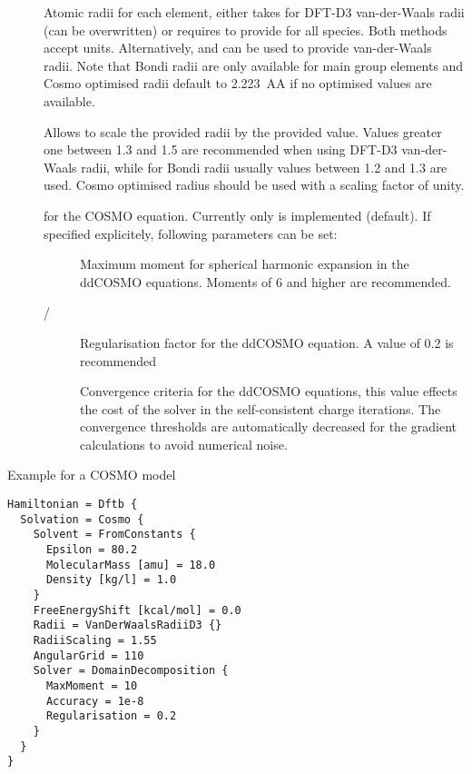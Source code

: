 \begin{description}
  \item[] Atomic radii for each element, either takes
     for DFT-D3 van-der-Waals radii (can be overwritten)
    or requires to provide  for all species.
    Both methods accept  units.
    Alternatively,  and 
    can be used to provide van-der-Waals radii. Note that Bondi radii\cite{mantina2009}
    are only available for main group elements and Cosmo optimised radii default to
    2.223~AA if no optimised values are available.

  \item[] Allows to scale the provided radii by the provided value.
    Values greater one between 1.3 and 1.5 are recommended when using DFT-D3 van-der-Waals
    radii, while for Bondi radii usually values between 1.2 and 1.3 are used.
    Cosmo optimised radius should be used with a scaling factor of unity.

  \item[] for the COSMO equation. Currently only
     is implemented (default). If specified
    explicitely, following parameters can be set:

    \begin{description}
      \item[]
        Maximum moment for spherical harmonic expansion in the ddCOSMO equations.
        Moments of 6 and higher are recommended.
      \item[ / ]
        Regularisation factor for the ddCOSMO equation. A value of 0.2 is recommended
      \item[]
        Convergence criteria for the ddCOSMO equations, this value effects the cost
        of the solver in the self-consistent charge iterations.
        The convergence thresholds are automatically decreased for the gradient
        calculations to avoid numerical noise.
    \end{description}
\end{description}

Example for a COSMO model

\begin{verbatim}
Hamiltonian = Dftb {
  Solvation = Cosmo {
    Solvent = FromConstants {
      Epsilon = 80.2
      MolecularMass [amu] = 18.0
      Density [kg/l] = 1.0
    }
    FreeEnergyShift [kcal/mol] = 0.0
    Radii = VanDerWaalsRadiiD3 {}
    RadiiScaling = 1.55
    AngularGrid = 110
    Solver = DomainDecomposition {
      MaxMoment = 10
      Accuracy = 1e-8
      Regularisation = 0.2
    }
  }
}
\end{verbatim}


